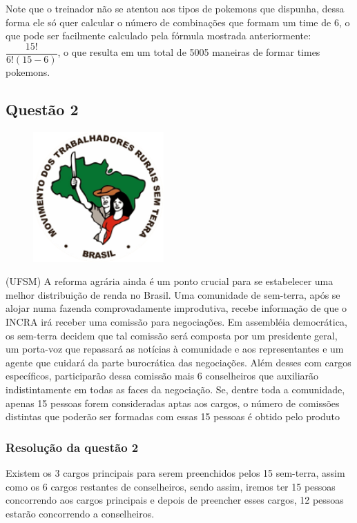 Note que o treinador não se atentou aos tipos de pokemons que dispunha, dessa forma ele só quer calcular o número de combinações que formam um time de 6, o que pode ser facilmente calculado pela fórmula mostrada anteriormente: $\dfrac{15!}{6!(15-6)}$, o que resulta em um total de 5005 maneiras de formar times pokemons.

\subsection*{Questão 2}

\begin{figure}
	\includegraphics[width=5cm, left]{imagens/mst.png}
\end{figure}

(UFSM) A reforma agrária ainda é um ponto crucial para se estabelecer uma melhor distribuição de renda no Brasil. Uma comunidade de sem-terra, após se alojar numa fazenda comprovadamente improdutiva, recebe informação de que o INCRA irá receber uma comissão para negociações. Em assembléia democrática, os sem-terra decidem que tal comissão será composta por um presidente geral, um porta-voz que repassará as notícias à comunidade e aos representantes e um agente que cuidará da parte burocrática das negociações. Além desses com cargos específicos, participarão dessa comissão mais 6 conselheiros que auxiliarão indistintamente em todas as faces da negociação.
Se, dentre toda a comunidade, apenas 15 pessoas forem consideradas aptas aos cargos, o número de comissões distintas que poderão ser formadas com essas 15 pessoas é obtido pelo produto

\subsubsection*{Resolução da questão 2}

Existem os 3 cargos principais para serem preenchidos pelos 15 sem-terra, assim como os 6 cargos restantes de conselheiros, sendo assim, iremos ter 15 pessoas concorrendo aos cargos principais e depois de preencher esses cargos, 12 pessoas estarão concorrendo a conselheiros.

